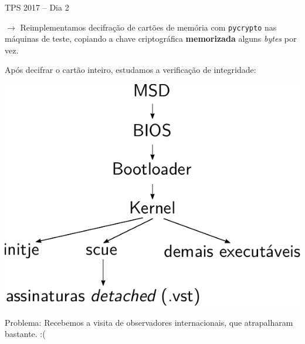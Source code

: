 \documentclass[10pt]{beamer}
\begin{document}

\begin{frame}{TPS 2017 -- Dia 2}

\alert{$\rightarrow$} Reimplementamos decifração de cartões de memória com \texttt{pycrypto} nas máquinas de teste, copiando a chave criptográfica {\bf memorizada} alguns \emph{bytes} por vez.

\bigskip

Após decifrar o cartão inteiro, estudamos a verificação de integridade:

\begin{center}
\includegraphics[scale=0.5]{autenticacao.pdf}
\end{center}

\alert{Problema:} Recebemos a visita de observadores internacionais, que atrapalharam bastante. :(

\end{frame}
\end{document}
